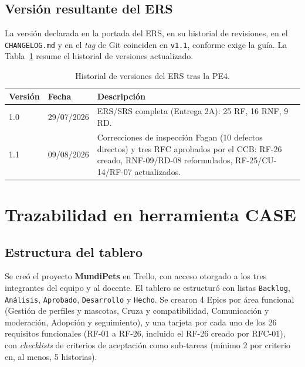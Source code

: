 \documentclass[journal,onecolumn]{IEEEtran}
\begin{document}
	\subsection{Versión resultante del ERS}
	
	La versión declarada en la portada del ERS, en su historial de
	revisiones, en el \texttt{CHANGELOG.md} y en el \emph{tag} de Git
	coinciden en \texttt{v1.1}, conforme exige la guía. La
	Tabla~\ref{tab:historial-ers} resume el historial de versiones
	actualizado.
	
	\begin{table}[H]
		\centering
		\caption{Historial de versiones del ERS tras la PE4.}
		\label{tab:historial-ers}
		\small
		\begin{tabularx}{\textwidth}{@{}l l X@{}}
			\toprule
			\textbf{Versión} & \textbf{Fecha} & \textbf{Descripción} \\
			\midrule
			1.0 & 29/07/2026 & ERS/SRS completa (Entrega 2A): 25 RF, 16 RNF, 9 RD. \\
			1.1 & 09/08/2026 & Correcciones de inspección Fagan (10 defectos directos) y tres RFC aprobados por el CCB: RF-26 creado, RNF-09/RD-08 reformulados, RF-25/CU-14/RF-07 actualizados. \\
			\bottomrule
		\end{tabularx}
	\end{table}
	
	\section{Trazabilidad en herramienta CASE}
	\label{sec:trazabilidad-case}
	
	\subsection{Estructura del tablero}
	
	Se creó el proyecto \textbf{MundiPets} en Trello, con acceso
	otorgado a los tres integrantes del equipo y al docente. El
	tablero se estructuró con listas \texttt{Backlog}, \texttt{Análisis},
	\texttt{Aprobado}, \texttt{Desarrollo} y \texttt{Hecho}. Se crearon
	4 Epics por área funcional (Gestión de perfiles y mascotas, Cruza
	y compatibilidad, Comunicación y moderación, Adopción y
	seguimiento), y una tarjeta por cada uno de los 26 requisitos
	funcionales (RF-01 a RF-26, incluido el RF-26 creado por RFC-01),
	con \emph{checklists} de criterios de aceptación como sub-tareas
	(mínimo 2 por criterio en, al menos, 5 historias).
	
\end{document}
